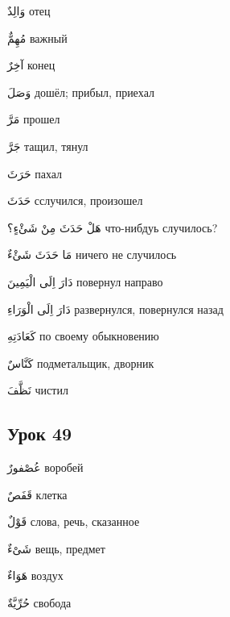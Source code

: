 \documentclass[a5paper]{article}
\newcommand\textstyleDropCaps[1]{#1}
\newcommand\textstyleCaptioncharacters[1]{#1}
\begin{document}
\textstyleCaptioncharacters{وَالِدٌ }\textstyleDropCaps{отец‎}

\textstyleCaptioncharacters{مُهِمٌّ }\textstyleDropCaps{важный‎}

\textstyleCaptioncharacters{آخِرٌ }\textstyleDropCaps{конец‎}

\textstyleCaptioncharacters{وَصَلَ }\textstyleDropCaps{дошёл; прибыл, прие­хал‎}

\textstyleCaptioncharacters{مَرَّ }\textstyleDropCaps{прошел‎}

\textstyleCaptioncharacters{جَرَّ }\textstyleDropCaps{тащил, тянул‎}

\textstyleCaptioncharacters{حَرَثَ }\textstyleDropCaps{пахал‎}

\textstyleCaptioncharacters{حَدَثَ }\textstyleDropCaps{сслучился, произо­шел‎}

\textstyleCaptioncharacters{هَلْ حَدَثَ مِنْ شَئْءٍ؟ }\textstyleDropCaps{что-нибдуь случилось?‎}

\textstyleCaptioncharacters{مَا حَدَثَ شَئْءٌ }\textstyleDropCaps{ничего не случилось‎}

\textstyleCaptioncharacters{دَارَ اِلَى الْيَمِينَ }\textstyleDropCaps{повер­нул направо‎}

\textstyleCaptioncharacters{دَارَ اِلَى الْوَرَاءِ }\textstyleDropCaps{развер­нулся, повернулся назад‎}

\textstyleCaptioncharacters{كَعَادَتِهِ }\textstyleDropCaps{по своему обык­новению‎}

\textstyleCaptioncharacters{كَنَّاسٌ }\textstyleDropCaps{подметальщик, дворник‎}

\textstyleCaptioncharacters{نَظَّفَ }\textstyleDropCaps{чистил‎}

\subsection[Урок 49‎]{\textstyleDropCaps{Урок 49‎}}
\textstyleCaptioncharacters{عُصْفورٌ }\textstyleDropCaps{воробей‎}

\textstyleCaptioncharacters{قَفَصٌ }\textstyleDropCaps{клетка‎}

\textstyleCaptioncharacters{قَوْلٌ }\textstyleDropCaps{слова, речь, сказан­ное‎}

\textstyleCaptioncharacters{شَىْءٌ }\textstyleDropCaps{вещь, предмет‎}

\textstyleCaptioncharacters{هَوَاءٌ }\textstyleDropCaps{воздух‎}

\textstyleCaptioncharacters{حُرِّيَّةٌ }\textstyleDropCaps{свобода‎}
\end{document}
